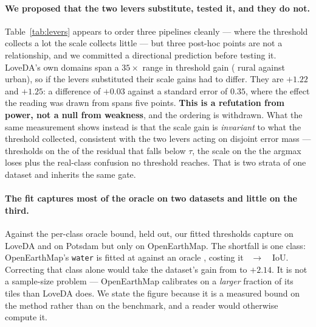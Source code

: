 \documentclass[10pt,a4paper]{article}                        %
\newcommand{\best}[1]{\textbf{#1}}
\begin{document}
\paragraph{We proposed that the two levers substitute, tested it, and they do
not.} Table~\ref{tab:levers} appears to order three pipelines cleanly --- where the
threshold collects a lot the scale collects little --- but three post-hoc points
are not a relationship, and we committed a directional prediction before testing
it. LoveDA's own domains span a $35\times$ range in threshold gain (\DOMr{} rural
against \DOMu{} urban), so if the levers substituted their scale gains had to
differ. They are $+1.22$ and $+1.25$: a difference of $+0.03$ against a standard
error of $0.35$, where the effect the reading was drawn from spans five points.
\best{This is a refutation from power, not a null from weakness}, and the ordering
is withdrawn. What the same measurement shows instead is that the scale gain is
\emph{invariant} to what the threshold collected, consistent with the two levers
acting on disjoint error mass --- thresholds on the \mechA{} of the residual that
falls below $\tau$, the scale on the \mechB{} the argmax loses plus the real-class
confusion no threshold reaches. That is two strata of one dataset and inherits
the same gate.

\paragraph{The fit captures most of the oracle on two datasets and little on the
third.} Against the per-class oracle bound, held out, our fitted thresholds
capture \capLove{} on LoveDA and \capPots{} on Potsdam but only \capOEM{} on
OpenEarthMap. The shortfall is one class: OpenEarthMap's \texttt{water} is
fitted at \capOemWaterFit{} against an oracle \capOemWaterOra{}, costing it
\capOemWaterA{}~$\to$~\capOemWaterB{}~IoU. Correcting that class alone would take
the dataset's gain from \mrOemFull{} to $+2.14$. It is not a sample-size problem
--- OpenEarthMap calibrates on a \emph{larger} fraction of its tiles than LoveDA
does. We state the figure because it is a measured bound on the method rather than
on the benchmark, and a reader would otherwise compute it.
\end{document}
